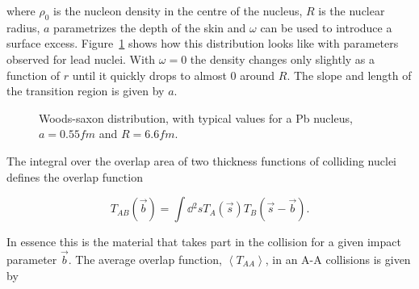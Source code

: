 \noindent where $\rho_0$ is the nucleon density in the centre of the nucleus, $R$ is the nuclear radius, $a$ parametrizes the depth of the skin and $\omega$ can be used to introduce a surface excess. Figure~\ref{fig:woodssaxon} shows how this distribution looks like with parameters observed for lead nuclei. With $\omega=0$ the density changes only slightly as a function of $r$ until it quickly drops to almost 0 around $R$. The slope and length of the transition region is given by $a$. 

\begin{figure}
\centering
{}
\caption{Woods-saxon distribution, with typical values for a Pb nucleus, $a=0.55\unit{fm}$ and $R=6.6\unit{fm}$.}
\label{fig:woodssaxon}
\end{figure}


The integral over the overlap area of two thickness functions of colliding nuclei defines the overlap function 

\begin{equation}
T_{AB}\left(\vec b\right)=\int \dd{^2s} T_A\left(\vec s\right) T_B\left(\vec s - \vec b\right).
\end{equation}

\noindent In essence this is the material that takes part in the collision for a given impact parameter $\vec b$. The average overlap function, $\left<T_{AA}\right>$, in an A-A collisions  is given by~\cite{Afanasiev:2009aa}


